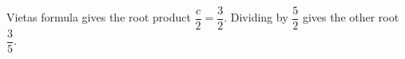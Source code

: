 Vieta\textquotesingle s formula gives the root product $\dfrac{c}{2}=\dfrac{3}{2}$. Dividing by $\dfrac{5}{2}$ gives the other root $\boxed{\dfrac{3}{5}}$.
